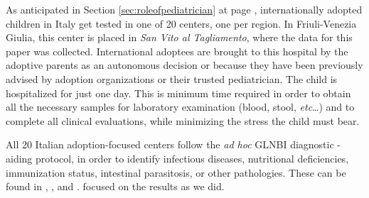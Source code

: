 

\label{chap:materialsandmethods}
As anticipated in Section \ref{sec:roleofpediatrician} at page \pageref{sec:roleofpediatrician},  internationally adopted children in Italy get tested in one of 20 centers, one per region. In Friuli-Venezia Giulia, this center is placed in \textit{San Vito al Tagliamento}, where the data for this paper was collected. International adoptees are brought to this hospital by the adoptive parents as an autonomous decision or because they have been previously advised by adoption organizations or their trusted pediatrician. The child is hospitalized for just one day. This is minimum time required in order to obtain all the necessary samples for laboratory examination (blood, stool, \textit{etc}\dots) and to complete all clinical evaluations, while minimizing the stress the child must bear.

All 20 Italian adoption-focused centers follow the \textit{ad hoc} GLNBI diagnostic - aiding protocol,  in order to identify infectious diseases, nutritional deficiencies, immunization status, intestinal parasitosis, or other pathologies. These can be found in  \cite{GNLBI1}, \cite{GNLBI2}, and \cite{GNLBI3}.
\cite{GNLBIexp} focused on the results as we did.

